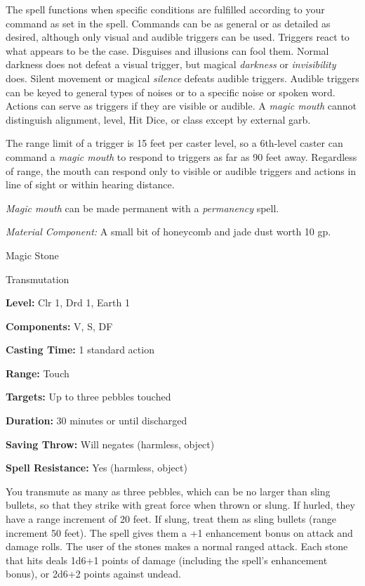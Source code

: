 \documentclass{article}
\begin{document}
The spell functions when specific conditions are fulfilled according to your command 
as set in the spell. Commands can be as general or as detailed as desired, although 
only visual and audible triggers can be used. Triggers react to what appears to 
be the case. Disguises and illusions can fool them. Normal darkness does not defeat 
a visual trigger, but magical \textit{darkness }or \textit{invisibility }does. 
Silent movement or magical \textit{silence }defeats audible triggers. Audible triggers 
can be keyed to general types of noises or to a specific noise or spoken word. 
Actions can serve as triggers if they are visible or audible. A \textit{magic mouth 
}cannot distinguish alignment, level, Hit Dice, or class except by external garb.

The range limit of a trigger is 15 feet per caster level, so a 6th-level caster 
can command a \textit{magic mouth }to respond to triggers as far as 90 feet away. 
Regardless of range, the mouth can respond only to visible or audible triggers 
and actions in line of sight or within hearing distance.

\textit{Magic mouth }can be made permanent with a \textit{permanency }spell.

\textit{Material Component: }A small bit of honeycomb and jade dust worth 10 gp.

\vspace{12pt}
Magic Stone

Transmutation

\textbf{Level:} Clr 1, Drd 1, Earth 1

\textbf{Components:} V, S, DF

\textbf{Casting Time:} 1 standard action

\textbf{Range:} Touch

\textbf{Targets:} Up to three pebbles touched

\textbf{Duration:} 30 minutes or until discharged

\textbf{Saving Throw: }Will negates (harmless, object)

\textbf{Spell Resistance:} Yes (harmless, object)

You transmute as many as three pebbles, which can be no larger than sling bullets, 
so that they strike with great force when thrown or slung. If hurled, they have 
a range increment of 20 feet. If slung, treat them as sling bullets (range increment 
50 feet). The spell gives them a +1 enhancement bonus on attack and damage rolls. 
The user of the stones makes a normal ranged attack\textit{. }Each stone that hits 
deals 1d6+1 points of damage (including the spell's enhancement bonus), or 2d6+2 
points against undead.
\end{document}
